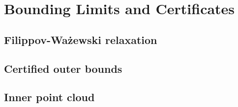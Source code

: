 
\section{Bounding Limits and Certificates}
\label{sec:bounding}

\subsection{Filippov-Ważewski relaxation}
\label{sub:filippov_wazewski_relaxation}

\subsection{Certified outer bounds}
\label{sub:certified_outer_bounds}

\subsection{Inner point cloud}
\label{sub:inner_point_cloud}
